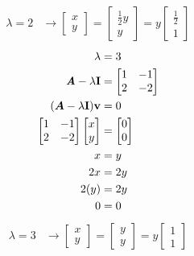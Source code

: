 \documentclass{article}
\begin{document}
\begin{align*}
	\lambda = 2 & \rightarrow \begin{bmatrix} x \\ y \end{bmatrix} = \begin{bmatrix} \frac{1}{2}y \\ y \end{bmatrix} = y \begin{bmatrix} \frac{1}{2} \\ 1 \end{bmatrix}
\end{align*}
\begin{align*}
	\lambda & = 3 \\
	\matr{A} - \lambda \vect{I} & =
		\begin{bmatrix}
			1 & -1 \\
			2 & -2
		\end{bmatrix} \\
	(\matr{A} - \lambda \vect{I})\vect{v} & = 0 \\
	\begin{bmatrix} 1 & -1 \\ 2 & -2 \end{bmatrix}
	\begin{bmatrix} x \\ y \end{bmatrix} & =
	\begin{bmatrix} 0 \\ 0 \end{bmatrix} \\
	x & = y \\
	2x & = 2y \\
	2(y) & = 2y \\
	0 & = 0
\end{align*}
\begin{align*}
	\lambda = 3 & \rightarrow \begin{bmatrix} x \\ y \end{bmatrix} = \begin{bmatrix} y \\ y \end{bmatrix} = y \begin{bmatrix} 1 \\ 1 \end{bmatrix}
\end{align*}
\end{document}
